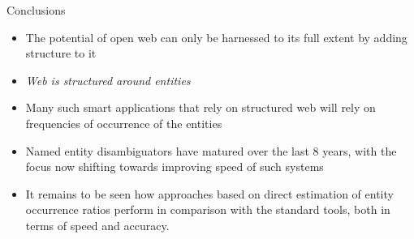 \begin{frame}{Conclusions}
 \begin{itemize}
  \item The potential of open web can only be harnessed to its full extent by adding structure to it \medskip
  \item \emph{Web is structured around entities} \medskip
  \item Many such smart applications that rely on structured web will rely on frequencies of occurrence of the entities \medskip
  \item Named entity disambiguators have matured over the last 8 years, with the focus now shifting towards
  improving speed of such systems \medskip 
 \item It remains to be seen how approaches based on direct estimation of entity occurrence ratios perform in comparison with the standard tools, both in terms of speed and accuracy.
 \end{itemize}

\end{frame}

